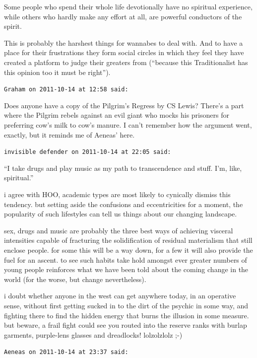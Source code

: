\begin{footnotesize}
\begin{sffamily}
Some people who spend their whole life devotionally have no spiritual experience, while others who hardly make any effort at all, are powerful conductors of the spirit.

This is probably the harshest things for wannabes to deal with. And to have a place for their frustrations they form social circles in which they feel they have created a platform to judge their greaters from (``because this Traditionalist has this opinion too it must be right'').

\hfill

\texttt{Graham on 2011-10-14 at 12:58 said:}

Does anyone have a copy of the Pilgrim's Regress by CS Lewis? There's a part where the Pilgrim rebels against an evil giant who mocks his prisoners for preferring cow's milk to cow's manure. I can't remember how the argument went, exactly, but it reminds me of Aeneas' here.

\hfill

\texttt{invisible defender on 2011-10-14 at 22:05 said:}

``I take drugs and play music as my path to transcendence and stuff. I'm, like, spiritual.''

i agree with HOO, academic types are most likely to cynically dismiss this tendency. but setting aside the confusions and eccentricities for a moment, the popularity of such lifestyles can tell us things about our changing landscape.

sex, drugs and music are probably the three best ways of achieving visceral intensities capable of fracturing the solidification of residual materialism that still enclose people. for some this will be a way down, for a few it will also provide the fuel for an ascent. to see such habits take hold amongst ever greater numbers of young people reinforces what we have been told about the coming change in the world (for the worse, but change nevertheless).

i doubt whether anyone in the west can get anywhere today, in an operative sense, without first getting sucked in to the dirt of the psychic in some way, and fighting there to find the hidden energy that burns the illusion in some measure. but beware, a frail fight could see you routed into the reserve ranks with burlap garments, purple-lens glasses and dreadlocks! lolzolzlolz ;-)

\hfill

\texttt{Aeneas on 2011-10-14 at 23:37 said:}


\end{sffamily}
\end{footnotesize}
